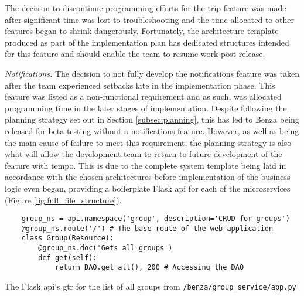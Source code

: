 \documentclass{article}
\begin{document}
    The decision to discontinue programming efforts for the trip feature was made after significant time was lost to troubleshooting and the time allocated to other features began to shrink dangerously. Fortunately, the architecture template produced as part of the implementation plan has dedicated structures intended for this feature and should enable the team to resume work post-release. \par
    
    \emph{Notifications.} The decision to not fully develop the notifications feature was taken after the team experienced setbacks late in the implementation phase. This feature was listed as a non-functional requirement and as such, was allocated programming time in the later stages of implementation. Despite following the planning strategy set out in Section \ref{subsec:planning}, this has led to Benza being released for beta testing without a notifications feature. However, as well as being the main cause of failure to meet this requirement, the planning strategy is also what will allow the development team to return to future development of the feature with tempo. This is due to the complete system template being laid in accordance with the chosen architectures before implementation of the business logic even began, providing a \gls{boilerplate} Flask \acrshort{api} for each of the \glspl{microservice} (Figure \ref{fig:full_file_structure}). \par
    
    \begin{listing}[ht]
    \begin{verbatim}
    group_ns = api.namespace('group', description='CRUD for groups')
    @group_ns.route('/') # The base route of the web application
    class Group(Resource):
        @group_ns.doc('Gets all groups')
        def get(self):
            return DAO.get_all(), 200 # Accessing the DAO
    \end{verbatim}
    \caption{The Flask \acrshort{api}'s \gls{gtr} for the list of all groups from \texttt{/benza/group_service/app.py}}
    \label{code:flask_get_all_groups}
    \end{listing}
    
\end{document}
